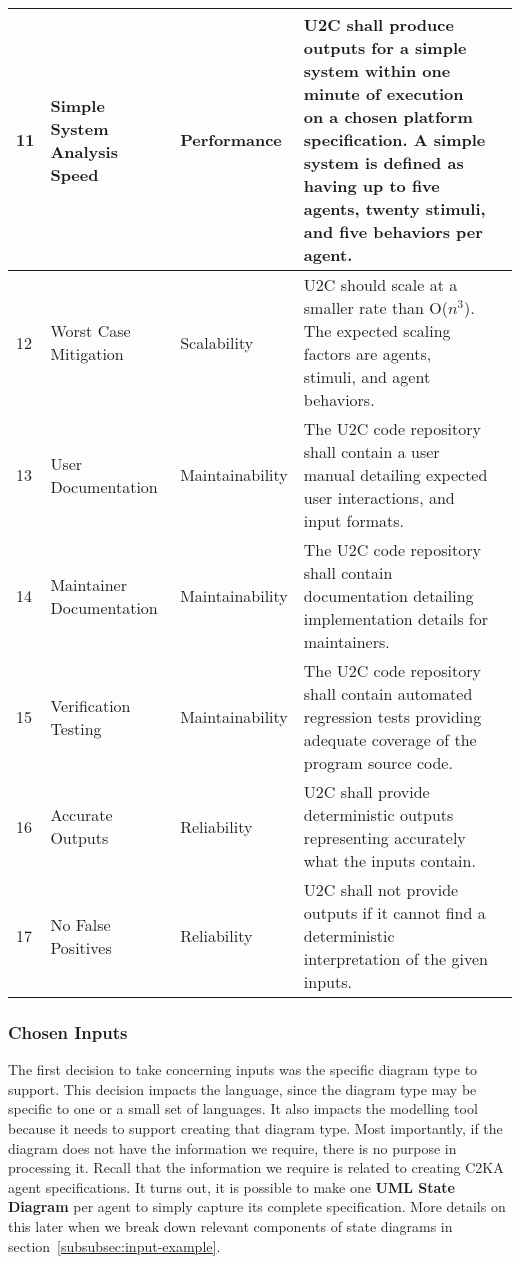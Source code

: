 \documentclass[11pt]{article}
\begin{document}
\begin{longtable}{|l|p{2.6cm}|l|p{4.5cm}|c|}
        \hline
        11 & Simple System Analysis Speed & Performance & U2C shall produce outputs for a simple system within one minute of execution on a chosen platform specification.
        A simple system is defined as having up to five agents, twenty stimuli, and five behaviors per agent. & \cellcolor{gray!30}  \\
        \hline
        12 & Worst Case Mitigation & Scalability & U2C should scale at a smaller rate than O($n^3$). The expected scaling factors are agents, stimuli, and agent behaviors. & \cellcolor{gray!30}  \\
        \hline
        13 & User Documentation & Maintainability & The U2C code repository shall contain a user manual detailing expected user interactions, and input formats. & \cellcolor{gray!30}  \\
        \hline
        14 & Maintainer Documentation & Maintainability & The U2C code repository shall contain documentation detailing implementation details for maintainers. & \cellcolor{green!30}  \\
        \hline
        15 & Verification Testing & Maintainability & The U2C code repository shall contain automated regression tests providing adequate coverage of the program source code. & \cellcolor{green!30}  \\
        \hline
        16 & Accurate Outputs & Reliability & U2C shall provide deterministic outputs representing accurately what the inputs contain. & \cellcolor{green!30}  \\
        \hline
        17 & No False Positives & Reliability & U2C shall not provide outputs if it cannot find a deterministic interpretation of the given inputs. & \cellcolor{green!30}  \\
        \hline
    \end{longtable}

    \subsubsection{Chosen Inputs}
    The first decision to take concerning inputs was the specific diagram type to support.
    This decision impacts the language, since the diagram type may be specific to one or a small set of languages.
    It also impacts the modelling tool because it needs to support creating that diagram type.
    Most importantly, if the diagram does not have the information we require, there is no purpose in processing it.
    Recall that the information we require is related to creating C2KA agent specifications.
    It turns out, it is possible to make one \textbf{UML State Diagram} per agent to simply capture its complete specification.
    More details on this later when we break down relevant components of state diagrams in section~\ref{subsubsec:input-example}.
\end{document}
